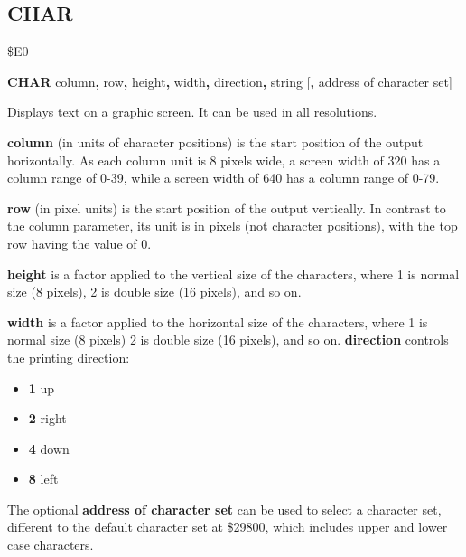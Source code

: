 
\newpage
\subsection{CHAR}
\begin{description}[leftmargin=2cm,style=nextline]
\item [Token:] \$E0
\item [Format:] {\bf CHAR} column{\bf,} row{\bf,} height{\bf,} width{\bf,}
		direction{\bf,} string [{\bf,} address of character set]
\item [Usage:]  Displays text on a graphic screen.
                It can be used in all resolutions.

                {\bf column} (in units of character positions) is the
                start position of the output horizontally.
                As each column unit is 8 pixels wide, a screen width of 320
                has a column range of 0-39, while a screen width of 640
                has a column range of 0-79.

                {\bf row} (in pixel units) is the start position of the output
                vertically. In contrast to the column parameter,
                its unit is in pixels (not character positions), with the top
                row having the value of 0.

                {\bf height} is a factor applied to the vertical
                size of the characters, where 1 is normal size (8 pixels),
                2 is double size (16 pixels), and so on.

                {\bf width} is a factor applied to the horizontal
                size of the characters, where 1 is normal size (8 pixels)
                2 is double size (16 pixels), and so on.
                {\bf direction} controls the printing direction: \\
                \begin{itemize}
                    \item {\bf 1} up
                    \item {\bf 2} right
                    \item {\bf 4} down
                    \item {\bf 8} left
                \end{itemize}

                The optional {\bf address of character set} can be used
                to select a character set, different to the default
                character set at \$29800, which includes upper and lower case
                characters.


\end{description}
